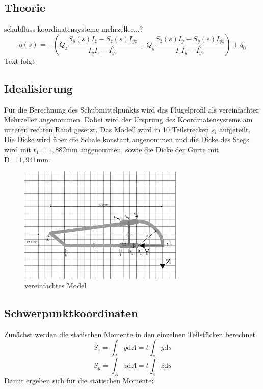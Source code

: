 
\subsection{Theorie}
schubfluss
koordinatensysteme
mehrzeller...?
\begin{equation}\label{qs}
	q(s)=-(Q_{\bar{z}}\frac{S_{\bar{y}}(s)I_{\bar{z}}-S_{\bar{z}}(s)I_{\bar{yz}}}{I_{\bar{y}}I_{\bar{z}}-I_{\bar{yz}}^2}+Q_{\bar{y}}\frac{S_{\bar{z}}(s)I_{\bar{y}}-S_{\bar{y}}(s)I_{\bar{yz}}}{I_{\bar{z}}I_{\bar{y}}-I_{\bar{yz}}^2})+q_0
\end{equation}
Text folgt
\subsection{Idealisierung}
Für die Berechnung des Schubmittelpunkts wird das Flügelprofil als vereinfachter Mehrzeller angenommen.
Dabei wird der Ursprung des Koordinatensystems am unteren rechten Rand gesetzt. Das Modell wird in 10 Teilstrecken $s_{i}$ aufgeteilt. Die Dicke wird über die Schale konstant angenommen und die Dicke des Stegs wird mit $t_{1}=1,882\mathrm{mm}$ angenommen, sowie die Dicke der Gurte mit $\mathrm{D}=1,941\mathrm{mm}$.
\begin{figure}[h]
 \centering
 \includegraphics[width=0.7\textwidth]{Bilder/Model1}
 \caption{vereinfachtes Model}
 \label{fig:Model1}
\end{figure}
\subsection{Schwerpunktkoordinaten}\label{SP-Koord}
Zunächst werden die statischen Momente in den einzelnen Teilstücken berechnet.
\begin{equation}
	S_{z}=\int_{A}^{}y \mathrm{d}A =t\int_{s}^{}y \mathrm{d}s
\end{equation}
\begin{equation}
	S_{y}=\int_{A}^{}z \mathrm{d}A =t\int_{s}^{}z \mathrm{d}s 
\end{equation}
Damit ergeben sich für die statischen Momente:

